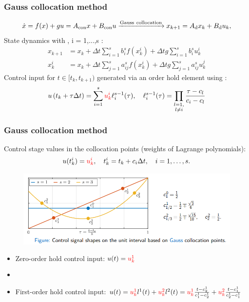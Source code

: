 \documentclass[student, noshadow, lsr, english, aspectratio=169]{ITR_LSR_slides}
\begin{document}
\begin{frame}
	\frametitle{Gauss collocation method}
$$
	\dot{x} =f(x)+g u=A_{\operatorname{con}} x+B_{\operatorname{con}} u \xrightarrow{\text{Gauss}\ \text{collocation}} x_{k+1}= A_{\rm{d}}x_k + B_{\rm{d}}u_k,
$$
State dynamics with {\color{red}{state stage values $x_k^i$}}, i = 1,...,s :
\begin{equation}
	\begin{split}
		x_{k+1} &=x_{k}+\Delta t \sum_{i=1}^{s} b_{i}^{s} f\left(x_{k}^{i}\right)+\Delta t g \sum_{i=1}^{s} b_{i}^{s} u_{k}^{i} \\
		x_{k}^{i} &=x_{k}+\Delta t \sum_{j=1}^{s} a_{i j}^{s} f\left(x_{k}^{i}\right)+\Delta t g \sum_{j=1}^{s} a_{i j}^{s} u_{k}^{j}
	\end{split}
\end{equation}
Control input for $t \in [t_k,t_{k+1})$ generated via an {\color{cyan}{$s - 1$}} order hold element using {\color{cyan}{Lagrange
interpolation polynomials}} \cite{kotyczka2021high}:
$$
u\left(t_{k}+\tau \Delta t\right)=\sum_{i=1}^{s} {\color{red}{u_{k}^{i}}} \ell_{i}^{s-1}(\tau),\quad
\ell_{i}^{s-1}(\tau)=\prod_{\substack{l=1,  \\ l \neq i}} \frac{\tau-c_{l}}{c_{i}-c{_l}}
$$
\end{frame}





\begin{frame}
	\frametitle{Gauss collocation method}
{\color{red}Control stage values} in the collocation points (weights of Lagrange polynomials):
$$
u(t_k^i) = {\color{red}{u_{k}^{i}}}, \quad t_k^i = t_k + c_i\Delta t, \quad i = 1,\ldots,s.
$$
	\begin{figure}[h]
		\centering
		\includegraphics[width=0.8\linewidth]{pics/1656506685657.png}
		\label{fig:gausscoll}
	\end{figure}
\begin{itemize}
	\item Zero-order hold control input: $u(t) = {\color{red}{u_k^1}}$
	\item[~]
	\item First-order hold control input: $
		u(t) = {\color{red}{u_{k}^{1}}} l^{1}(t)+{\color{red}{u_{k}^{2}}} l^{2}(t)
		={\color{red}{u_{k}^{1}}} \frac{t-c_{2}^{1}}{c_{1}^{1}-c_{2}^{1}}+{\color{red}{u_{k}^{2}}} \frac{t-c_{1}^{1}}{c_{2}^{1}-c_{1}^{1}}$
\end{itemize}
\vspace{\baselineskip}
\end{frame}
\end{document}
